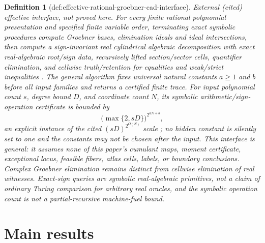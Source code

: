 \documentclass{article}
\newtheorem{definition}{Definition}
\begin{document}
\begin{definition}[def:effective-rational-groebner-cad-interface]\label{def:effective-rational-groebner-cad-interface}
\emph{External (cited) effective interface, not proved here.} For every finite rational polynomial presentation and specified finite variable order, terminating exact symbolic procedures compute Groebner bases, elimination ideals and ideal intersections, then compute a sign-invariant real cylindrical algebraic decomposition with exact real-algebraic root/sign data, recursively lifted section/sector cells, quantifier elimination, and cellwise truth/retention for equalities and weak/strict inequalities \cite{CoxLittleOShea2015,Collins1975,BasuPollackRoy2006}. The general algorithm fixes universal natural constants $a\ge1$ and $b$ before all input families and returns a certified finite trace. For input polynomial count $s$, degree bound $D$, and coordinate count $N$, its symbolic arithmetic/sign-operation certificate is bounded by
\[
  \bigl(\max\{2,sD\}\bigr)^{2^{aN+b}},
\]
an explicit instance of the cited $(sD)^{2^{O(N)}}$ scale \cite[Sec.~2.1.2, Thm.~2.4]{Basu2017RAAGSurvey}; no hidden constant is silently set to one and the constants may not be chosen after the input. This interface is general: it assumes none of this paper's cumulant maps, moment certificate, exceptional locus, feasible fibers, atlas cells, labels, or boundary conclusions. Complex Groebner elimination remains distinct from cellwise elimination of real witnesses. Exact-sign queries are symbolic real-algebraic primitives, not a claim of ordinary Turing comparison for arbitrary real oracles, and the symbolic operation count is not a partial-recursive machine-fuel bound.
\end{definition}

\section{Main results}
\end{document}
